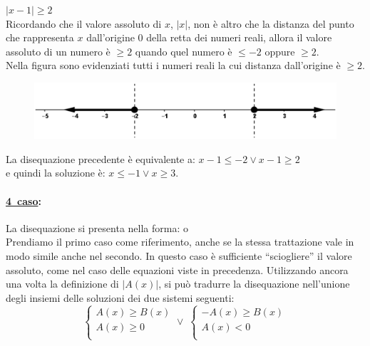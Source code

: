 \begin{esempio} $|x-1|\geq 2$\\[4pt] Ricordando che il valore 
assoluto di $x$, $|x|$, non è altro che la distanza del punto che rappresenta 
$x$ dall'origine 0 della retta dei numeri reali, allora il valore assoluto di 
un numero è $\geq 2$ quando quel numero è $\leq -2$ oppure $\geq 2$.\\
        Nella figura sono evidenziati tutti i numeri reali la cui distanza 
dall'origine è $\geq 2$.
\begin{figure}[h]
\begin{center}
\begin{inaccessibleblock}[TODO]
\centering
\includegraphics[width=0.7\linewidth]{img/imm5} %
\end{inaccessibleblock}
\label{fig:abs_imm5}
\end{center}
\end{figure}
La disequazione precedente è equivalente a: \(x-1\leq -2 \vee x-1 \geq 2\) \\[4pt]
e quindi la soluzione è: \(x\leq -1 \vee x\geq 3.\)
\end{esempio}

\paragraph{\underline{4\textdegree~caso}:} La disequazione si presenta nella forma:  
 o \\[4pt]
Prendiamo il primo caso come riferimento, anche se la stessa trattazione vale in modo simile anche nel secondo.
In questo caso è sufficiente ``sciogliere'' il valore assoluto, come nel caso delle equazioni viste in precedenza.
Utilizzando ancora una volta la definizione di $|A(x)|$, si può tradurre la disequazione
nell'unione degli insiemi delle soluzioni dei due sistemi seguenti:
$$
\left\lbrace 
\begin{array}{l}
A(x)\geq B(x)\\
A(x)\geq 0\\
\end{array}
\right.
\vee \;
\left\lbrace 
\begin{array}{l}
-A(x)\geq B(x)\\
A(x)< 0\\
\end{array}
\right.
$$

